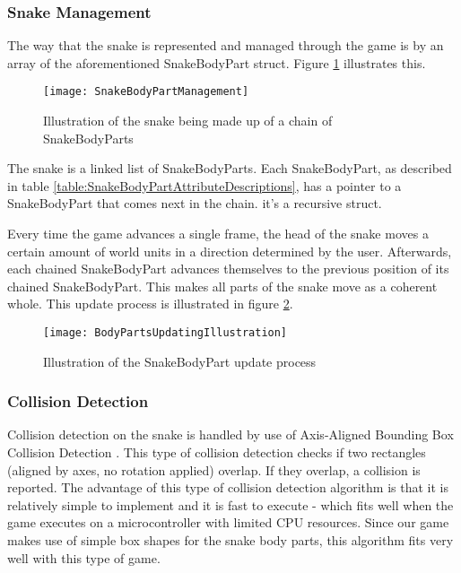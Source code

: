 \subsubsection{Snake Management}
The way that the snake is represented and managed through the game is by an array of the aforementioned SnakeBodyPart struct. Figure \ref{SnakeBodyPartManagement} illustrates this.

\begin{figure}[H]
	\texttt{[image: SnakeBodyPartManagement]}
	\centering
	\caption{Illustration of the snake being made up of a chain of SnakeBodyParts}
	\label{SnakeBodyPartManagement}
\end{figure} 

The snake is a linked list \cite{LinkedLists} of SnakeBodyParts. Each SnakeBodyPart, as described in table \ref{table:SnakeBodyPartAttributeDescriptions}, has a pointer to a SnakeBodyPart that comes next in the chain. it's a recursive struct.

Every time the game advances a single frame, the head of the snake moves a certain amount of world units in a direction determined by the user. Afterwards, each chained SnakeBodyPart advances themselves to the previous position of its chained SnakeBodyPart. This makes all parts of the snake move as a coherent whole. This update process is illustrated in figure \ref{SnakeBodyPartUpdateProcess}.

\begin{figure}[H]
	\texttt{[image: BodyPartsUpdatingIllustration]}
	\centering
	\caption{Illustration of the SnakeBodyPart update process}
	\label{SnakeBodyPartUpdateProcess}
\end{figure} 

\subsubsection{Collision Detection}
\label{section:CollisionDetection}

Collision detection on the snake is handled by use of Axis-Aligned Bounding Box Collision Detection \cite{CollisionDetection}. This type of collision detection checks if two rectangles (aligned by axes, no rotation applied) overlap. If they overlap, a collision is reported. The advantage of this type of collision detection algorithm is that it is relatively simple to implement and it is fast to execute - which fits well when the game executes on a microcontroller with limited CPU resources. Since our game makes use of simple box shapes for the snake body parts, this algorithm fits very well with this type of game.







